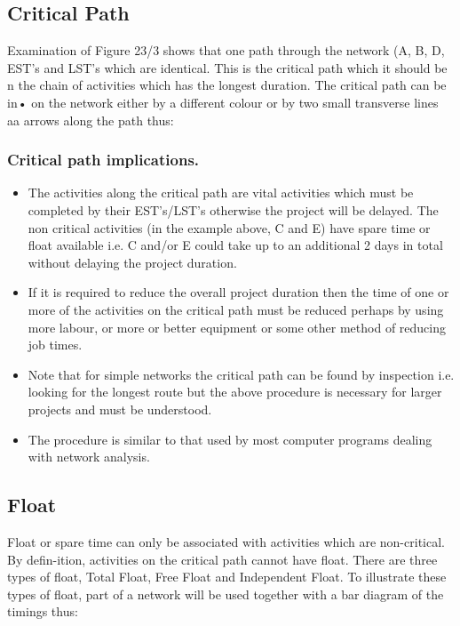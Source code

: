 \documentclass[]{report}
\begin{document}
\subsection{Critical Path} 
Examination of Figure 23/3 shows that one path through the network (A, B, D, EST's and LST's which are identical. This is the critical path which it should be n the chain of activities which has the longest duration. The critical path can be in• on the network either by a different colour or by two small transverse lines aa arrows along the path thus: 




\subsubsection{Critical path implications.} 
\begin{itemize}
	\item The activities along the critical path are vital activities which must be completed by their EST's/LST's otherwise the project will be delayed. The non critical activities (in the example above, C and E) have spare time or float available i.e. C and/or E could take up to an additional 2 days in total without delaying the project duration. 
	\item If it is required to reduce the overall project duration then the time of one or more of the activities on the critical path must be reduced perhaps by using more labour, or more or better equipment or some other method of reducing job times. \item Note that for simple networks the critical path can be found by inspection i.e. looking for the longest route but the above procedure is necessary for larger projects and must be understood. 
	\item The procedure is similar to that used by most computer programs dealing with network analysis. 
\end{itemize}

\subsection{Float} 
Float or spare time can only be associated with activities which are non-critical. By defin-ition, activities on the critical path cannot have float. There are three types of float, Total Float, Free Float and Independent Float. To illustrate these types of float, part of a network will be used together with a bar diagram of the timings thus: 
\end{document}
